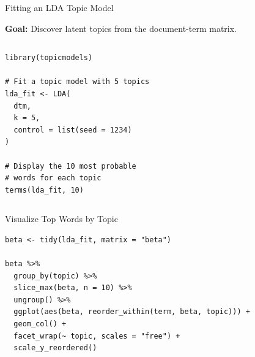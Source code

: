 \documentclass[aspectratio=169]{beamer}
\begin{document}
\begin{frame}[fragile]{Fitting an LDA Topic Model}

\small

\textbf{Goal:} Discover latent topics from the document-term matrix.

\vspace{0.3cm}

\begin{columns}[T]


\begin{lstlisting}[style=Rstyle]
library(topicmodels)

# Fit a topic model with 5 topics
lda_fit <- LDA(
  dtm,
  k = 5,
  control = list(seed = 1234)
)

# Display the 10 most probable
# words for each topic
terms(lda_fit, 10)
\end{lstlisting}


\pause


\end{columns}

\end{frame}

\begin{frame}[fragile]{Visualize Top Words by Topic}
\begin{lstlisting}[style=Rstyle]
beta <- tidy(lda_fit, matrix = "beta")

beta %>%
  group_by(topic) %>%
  slice_max(beta, n = 10) %>%
  ungroup() %>%
  ggplot(aes(beta, reorder_within(term, beta, topic))) +
  geom_col() +
  facet_wrap(~ topic, scales = "free") +
  scale_y_reordered()
\end{lstlisting}
\end{frame}
\end{document}
